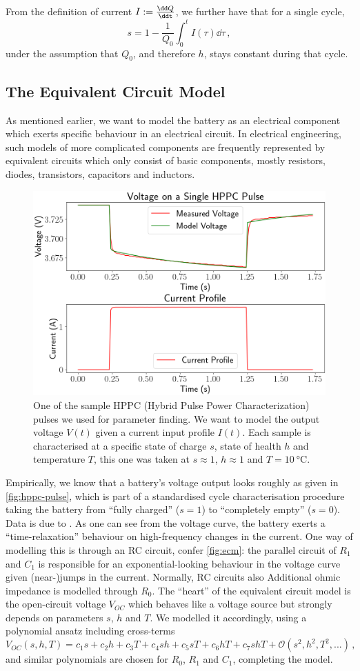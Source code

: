 \documentclass{prettytex/ox/mmsc-special-topic}
\begin{document}
  From the definition of current $I := \frac{\dd Q}{\ddt}$, we further have that for a single cycle,
  $$s = 1 - \frac{1}{Q_0} \int_0^t I(\tau) \dd\tau \,,$$
  under the assumption that $Q_0$, and therefore $h$, stays constant during that cycle.

  \subsection{The Equivalent Circuit Model}
  As mentioned earlier, we want to model the battery as an electrical component which exerts specific behaviour in an electrical circuit.
  In electrical engineering, such models of more complicated components are frequently represented by equivalent circuits which only consist of basic components, mostly resistors, diodes, transistors, capacitors and inductors.

  \begin{figure}[H]
    \centering
    \includegraphics[width=0.6\linewidth]{figures/hppc-pulse.png}
    \caption{One of the sample HPPC (Hybrid Pulse Power Characterization) pulses we used for parameter finding. We want to model the output voltage $V(t)$ given a current input profile $I(t)$. Each sample is characterised at a specific state of charge $s$, state of health $h$ and temperature $T$, this one was taken at $s \approx 1$, $h \approx 1$ and $T = \SI{10}{\degreeCelsius}$.}
    \label{fig:hppc-pulse}
  \end{figure}

  Empirically, we know that a battery's voltage output looks roughly as given in \autoref{fig:hppc-pulse}, which is part of a standardised cycle characterisation procedure taking the battery from ``fully charged'' ($s=1$) to ``completely empty'' ($s=0$). Data is due to \cite{panasonicnums}.
  As one can see from the voltage curve, the battery exerts a ``time-relaxation'' behaviour on high-frequency changes in the current.
  One way of modelling this is through an RC circuit, confer \autoref{fig:ecm}: the parallel circuit of $R_1$ and $C_1$ is responsible for an exponential-looking behaviour in the voltage curve given (near-)jumps in the current.
  Normally, RC circuits also
  Additional ohmic impedance is modelled through $R_0$.
  The ``heart'' of the equivalent circuit model is the open-circuit voltage $V_{OC}$ which behaves like a voltage source but strongly depends on parameters $s$, $h$ and $T$.
  We modelled it accordingly, using a polynomial ansatz including cross-terms $$V_{OC}(s, h, T) = c_1 s + c_2 h + c_3 T + c_4 sh + c_5 sT + c_6 hT + c_7 shT + \mathcal{O}(s^2, h^2, T^2, ...)\,,$$
  and similar polynomials are chosen for $R_0$, $R_1$ and $C_1$, completing the model.
\end{document}
